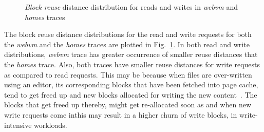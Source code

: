 \begin{figure}[t]
	\caption{\textit{Block reuse} distance distribution for reads and writes in \textit{webvm} and \textit{homes} traces}
	\label{fig:reusedist-read-write-distrib}
\end{figure}

The block reuse distance distributions for the read and write requests for
both the \textit{webvm} and the \textit{homes} traces are plotted in
Fig.~\ref{fig:reusedist-read-write-distrib}. 
In both read and write distributions, \textit{webvm} trace has greater occurrence of
smaller reuse distances that the \textit{homes} trace. Also, both traces have 
smaller reuse distances for write requests as compared to read requests. This 
may be because when files are over-written using an editor, its corresponding
blocks that have been fetched into page cache, tend to get freed up and new
blocks allocated for writing the new content~\cite{longterm-fair}. 
The blocks that get freed up thereby, might get re-allocated soon as and when
new write requests come in\textemdash{}this may result in a higher churn of write blocks, 
in write-intensive workloads.


